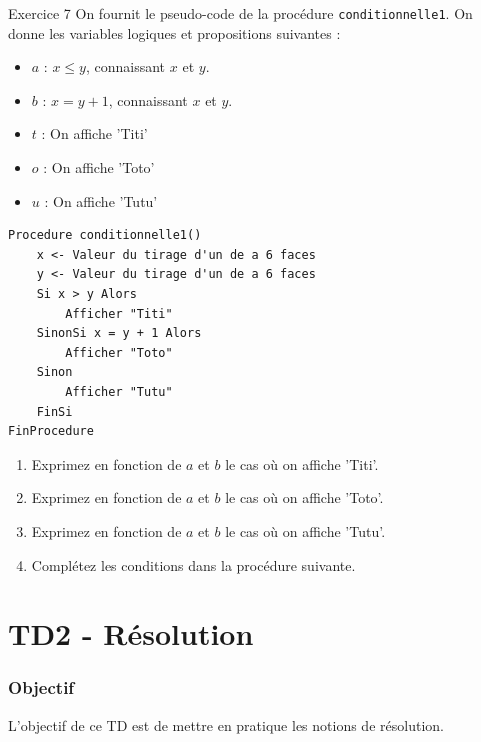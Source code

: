 \documentclass[a4paper,11pt]{article}
\begin{document}
\begin{exercisebox}{Exercice 7}
On fournit le pseudo-code de la procédure \texttt{conditionnelle1}. On donne les variables logiques et propositions suivantes :
\begin{itemize}
    \item $a$ : $x \leq y$, connaissant $x$ et $y$.
    \item $b$ : $x = y + 1$, connaissant $x$ et $y$.
    \item $t$ : On affiche 'Titi'
    \item $o$ : On affiche 'Toto'
    \item $u$ : On affiche 'Tutu'
\end{itemize}

\begin{lstlisting}
Procedure conditionnelle1()
    x <- Valeur du tirage d'un de a 6 faces
    y <- Valeur du tirage d'un de a 6 faces
    Si x > y Alors
        Afficher "Titi"
    SinonSi x = y + 1 Alors
        Afficher "Toto"
    Sinon
        Afficher "Tutu"
    FinSi
FinProcedure
\end{lstlisting}

\begin{enumerate}
    \item Exprimez en fonction de $a$ et $b$ le cas où on affiche 'Titi'.
    \item Exprimez en fonction de $a$ et $b$ le cas où on affiche 'Toto'.
    \item Exprimez en fonction de $a$ et $b$ le cas où on affiche 'Tutu'.
    \item Complétez les conditions dans la procédure suivante.
\end{enumerate}
\end{exercisebox}

\newpage


\part{TD2 - Résolution}

\section*{Objectif}
L'objectif de ce TD est de mettre en pratique les notions de résolution.
\end{document}
